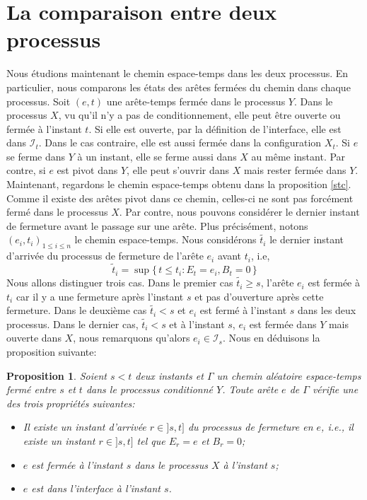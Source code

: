 \documentclass[titlepage,a4paper,12pt]{article}
\newcounter{th}
\newcounter{propo}
\newtheorem{prop}[propo]{Proposition}
\begin{document}
\section{La comparaison entre deux processus}
Nous étudions maintenant le chemin espace-temps dans les deux processus. En particulier, nous comparons les états des arêtes fermées du chemin dans chaque processus.
Soit $(e,t)$ une arête-temps fermée dans le processus $Y$. Dans le processus $X$, vu qu'il n'y a pas de conditionnement, elle peut être ouverte ou fermée à l'instant $t$. Si elle est ouverte, par la définition de l'interface, elle est dans $ \mathcal{I}_t$. Dans le cas contraire, elle est aussi fermée dans la configuration $X_t$. Si $e$ se ferme dans $Y$ à un instant, elle se ferme aussi dans $X$ au même instant. Par contre, si $e$ est pivot dans $Y$, elle peut s'ouvrir dans $X$ mais rester fermée dans $Y$. Maintenant, regardons le chemin espace-temps obtenu dans la proposition \ref{stc}. Comme il existe des arêtes pivot dans ce chemin, celles-ci ne sont pas forcément fermé dans le processus $X$. Par contre, nous pouvons considérer le dernier instant de fermeture avant le passage sur une arête. Plus précisément, notons $(e_i,t_i)_{1\leqslant i \leqslant n}$ le chemin espace-temps. Nous considérons $\tilde{t_i}$ le dernier instant d'arrivée du processus de fermeture de l'arête $e_i$ avant $t_i$, i.e,
$$ \widetilde{t}_i = \sup \big\{\, t\leqslant t_i: E_{t} = e_i, B_t = 0\,\big\}
$$
Nous allons distinguer trois cas. Dans le premier cas $\widetilde{t_i}\geqslant s$, l'arête $e_i$ est fermée à $t_i$ car il y a une fermeture après l'instant $s$ et pas d'ouverture après cette fermeture. Dans le deuxième cas $\widetilde{t_i}< s$ et $e_i$ est fermé à l'instant $s$ dans les deux processus. Dans le dernier cas, $\widetilde{t_i}< s$ et à l'instant $s$, $e_i$ est fermée dans $Y$ mais ouverte dans $X$, nous remarquons qu'alors $e_i \in \mathcal{I}_s$. Nous en déduisons la proposition suivante:

\begin{prop}\label{couple} Soient $s<t$ deux instants et $\Gamma$ un chemin aléatoire espace-temps fermé entre $s$ et $t$ dans le processus conditionné $Y$. Toute arête $e$ de $\Gamma$ vérifie une des trois propriétés suivantes:
\begin{itemize}[leftmargin = 1cm]
\item[(i)] Il existe un instant d'arrivée $r\in ]s,t]$ du processus de fermeture en $e$, i.e., il existe un instant $r\in]s,t]$ tel que $E_r = e$ et $B_r = 0$;
\item[(ii)] $e$ est fermée à l'instant $s$ dans le processus $X$ à l'instant $s$;
\item[(iii)] $e$ est dans l'interface à l'instant $s$.

\end{itemize}
\end{prop}
\end{document}
